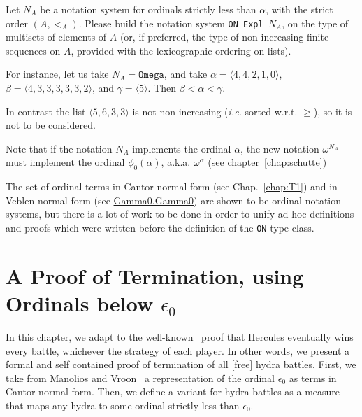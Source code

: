 \begin{project}
Let $N_A$ be a notation system for ordinals strictly less than $\alpha$, 
with the strict order $(A,<_A)$. Please build the notation system
\texttt{ON\_Expl $N_A$}, on the type of multisets of elements of $A$
(or, if preferred, the type of non-increasing finite sequences on $A$,
provided with the lexicographic ordering on lists).

For instance, let us take $N_A=\texttt{Omega}$, and take $\alpha=\langle 4,4,2,1,0\rangle$,
 $\beta=\langle 4,3,3,3,3,3,2\rangle$, and $\gamma=\langle 5\rangle$. Then $\beta<\alpha<\gamma$. 

In contrast the list $\langle5,6,3,3\rangle$ is not non-increasing (\emph{i.e.} sorted w.r.t. $\geq$), so it is not to be considered.

Note that if the notation $N_A$ implements the ordinal 
$\alpha$,  the new notation $\omega^{N_A}$ must implement the ordinal $\phi_0(\alpha)$, a.k.a. $\omega^\alpha$ (see chapter~\ref{chap:schutte})

\end{project}



\begin{remark}
 The set of ordinal terms in Cantor normal form (see Chap.~\ref{chap:T1}) and 
in Veblen normal form (see 
\href{../theories/html/hydras.Gamma0.Gamma0.html}{Gamma0.Gamma0}) are shown to be ordinal notation systems, but there is a lot of work to be done in order to unify ad-hoc  definitions and proofs which were written before the definition of the \texttt{ON} type class.
\end{remark}











\chapter[A proof of termination, using epsilon0]{A Proof of Termination, using Ordinals below \texorpdfstring{$\epsilon_0$}{Epsilon0}}

\label{cnf-math-def}
\label{chap:T1}

In this chapter, we adapt to \coq{} the well-known~\cite{KP82}  proof that Hercules eventually wins every battle, whichever the strategy  of each player.
In other words, we present  a formal and self contained proof of termination  of all [free] hydra battles.
First, we take from Manolios and Vroon~\cite{Manolios2005} a representation of the ordinal $\epsilon_0$ as terms in Cantor normal form. Then, we define a variant for hydra battles as a measure that maps any hydra to some ordinal strictly less than $\epsilon_0$.




